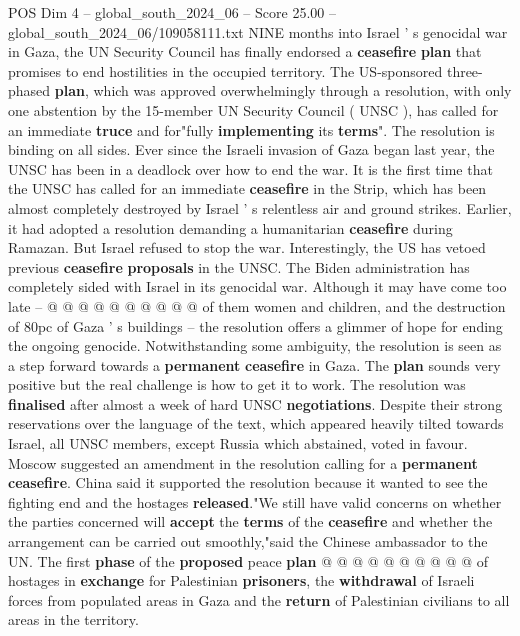 \begin{textsample}{POS Dim 4 – global\_south\_2024\_06 – Score 25.00 – global\_south\_2024\_06/109058111.txt}  \label{ex:f4_pos_087}
NINE months into Israel ' s genocidal war in Gaza, the UN Security Council has finally endorsed a \textbf{ceasefire} \textbf{plan} that promises to end hostilities in the occupied territory.
The US-sponsored three-phased \textbf{plan}, which was approved overwhelmingly through a resolution, with only one abstention by the 15-member UN Security Council ( UNSC ), has called for an immediate \textbf{truce} and for"fully \textbf{implementing} its \textbf{terms}".
The resolution is binding on all sides.
Ever since the Israeli invasion of Gaza began last year, the UNSC has been in a deadlock over how to end the war.
It is the first time that the UNSC has called for an immediate \textbf{ceasefire} in the Strip, which has been almost completely destroyed by Israel ' s relentless air and ground strikes.
Earlier, it had adopted a resolution demanding a humanitarian \textbf{ceasefire} during Ramazan.
But Israel refused to stop the war.
Interestingly, the US has vetoed previous \textbf{ceasefire} \textbf{proposals} in the UNSC.
The Biden administration has completely sided with Israel in its genocidal war.
Although it may have come too late -- @ @ @ @ @ @ @ @ @ @ of them women and children, and the destruction of 80pc of Gaza ' s buildings -- the resolution offers a glimmer of hope for ending the ongoing genocide.
Notwithstanding some ambiguity, the resolution is seen as a step forward towards a \textbf{permanent} \textbf{ceasefire} in Gaza.
The \textbf{plan} sounds very positive but the real challenge is how to get it to work.
The resolution was \textbf{finalised} after almost a week of hard UNSC \textbf{negotiations}.
Despite their strong reservations over the language of the text, which appeared heavily tilted towards Israel, all UNSC members, except Russia which abstained, voted in favour.
Moscow suggested an amendment in the resolution calling for a \textbf{permanent} \textbf{ceasefire}.
China said it supported the resolution because it wanted to see the fighting end and the hostages \textbf{released}."We still have valid concerns on whether the parties concerned will \textbf{accept} the \textbf{terms} of the \textbf{ceasefire} and whether the arrangement can be carried out smoothly,"said the Chinese ambassador to the UN.
The first \textbf{phase} of the \textbf{proposed} peace \textbf{plan} @ @ @ @ @ @ @ @ @ @ of hostages in \textbf{exchange} for Palestinian \textbf{prisoners}, the \textbf{withdrawal} of Israeli forces from populated areas in Gaza and the \textbf{return} of Palestinian civilians to all areas in the territory.

\end{textsample}

